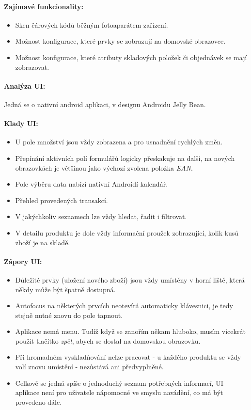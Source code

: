\paragraph{Zajímavé funkcionality:}
\begin{itemize}
	\item Sken čárových kódů běžným fotoaparátem zařízení.
	\item Možnost konfigurace, které prvky se zobrazují na domovské obrazovce.
	\item Možnost konfigurace, které atributy skladových položek či objednávek se mají zobrazovat.
\end{itemize}

\paragraph{Analýza UI:} Jedná se o nativní android aplikaci, v designu Androidu Jelly Bean. 

\paragraph{Klady UI:}
\begin{itemize}
	\item U pole množství jsou vždy zobrazena \uv{+} a \uv{-} pro usnadnění rychlých změn.
	\item Přepínání aktivních polí formulářů logicky přeskakuje na další, na nových obrazovkách je většinou jako výchozí zvolena položka \emph{EAN}.
	\item Pole výběru data nabízí nativní Androidí kalendář.
	\item Přehled provedených transakcí.
	\item V jakýchkoliv seznamech lze vždy hledat, řadit i filtrovat.
	\item V detailu produktu je dole vždy informační proužek zobrazující, kolik kusů zboží je na skladě.
\end{itemize}

\paragraph{Zápory UI:}
\begin{itemize}
	\item Důležité prvky (uložení nového zboží) jsou vždy umístěny v horní liště, která někdy může být špatně dostupná.
	\item Autofocus na některých prvcích neotevírá automaticky klávesnici, je tedy stejně nutné znovu do pole tapnout.
	\item Aplikace nemá menu. Tudíž když se zanořím někam hluboko, musím vícekrát použít tlačítko \emph{zpět}, abych se dostal na domovskou obrazovku.
	\item Při hromadném vyskladňování nelze pracovat  - u každého produktu se vždy volí znovu umístění - nezůstává ani předvyplněné.
	\item Celkově se jedná spíše o jednoduchý seznam potřebných informací, UI aplikace není pro uživatele nápomocné ve smyslu navádění, co má být provedeno dále.
\end{itemize}

